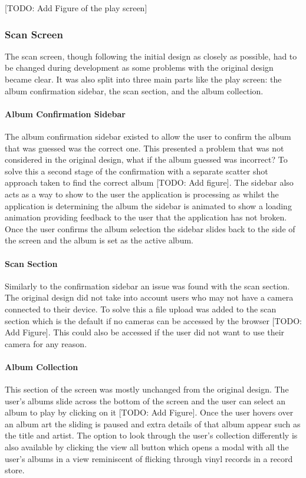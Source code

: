 [TODO: Add Figure of the play screen]

\subsubsection{Scan Screen}
The scan screen, though following the initial design as closely as possible, had to be changed during development as some problems with the original design became clear. It was also split into three main parts like the play screen: the album confirmation sidebar, the scan section, and the album collection.

\paragraph{Album Confirmation Sidebar}
The album confirmation sidebar existed to allow the user to confirm the album that was guessed was the correct one. This presented a problem that was not considered in the original design, what if the album guessed was incorrect? To solve this a second stage of the confirmation with a separate scatter shot approach taken to find the correct album [TODO: Add figure]. The sidebar also acts as a way to show to the user the application is processing as whilst the application is determining the album the sidebar is animated to show a loading animation providing feedback to the user that the application has not broken. Once the user confirms the album selection the sidebar slides back to the side of the screen and the album is set as the active album.

\paragraph{Scan Section}
Similarly to the confirmation sidebar an issue was found with the scan section. The original design did not take into account users who may not have a camera connected to their device. To solve this a file upload was added to the scan section which is the default if no cameras can be accessed by the browser [TODO: Add Figure]. This could also be accessed if the user did not want to use their camera for any reason.

\paragraph{Album Collection}
This section of the screen was mostly unchanged from the original design. The user's albums slide across the bottom of the screen and the user can select an album to play by clicking on it [TODO: Add Figure]. Once the user hovers over an album art the sliding is paused and extra details of that album appear such as the title and artist. The option to look through the user's collection differently is also available by clicking the view all button which opens a modal with all the user's albums in a view reminiscent of flicking through vinyl records in a record store.

